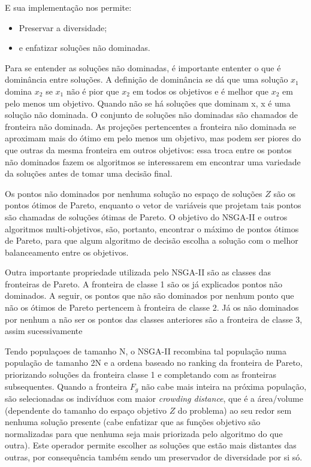 E sua implementação nos permite:

\begin{itemize}
    \item Preservar a diversidade;
    \item e enfatizar soluções não dominadas.
\end{itemize}

Para se entender as soluções não dominadas, é importante ententer o que é dominância entre soluções. A definição de dominância se dá que uma solução $x_{1}$ domina $x_{2}$ se $x_{1}$ não é pior que $x_{2}$ em todos os objetivos e é melhor que $x_{2}$ em pelo menos um objetivo. Quando não se há soluções que dominam x, x é uma solução não dominada. O conjunto de soluções não dominadas são chamados de fronteira não dominada. As projeções pertencentes a fronteira não dominada se aproximam mais do ótimo em pelo menos um objetivo, mas podem ser piores do que outras da mesma fronteira em outros objetivos: essa troca entre os pontos não dominados fazem os algoritmos se interessarem em encontrar uma variedade da soluções antes de tomar uma decisão final.

Os pontos não dominados por nenhuma solução no espaço de soluções $Z$ são os pontos ótimos de Pareto, enquanto o vetor de variáveis que projetam tais pontos são chamadas de soluções ótimas de Pareto. O objetivo do NSGA-II e outros algoritmos multi-objetivos, são, portanto, encontrar o máximo de pontos ótimos de Pareto, para que algum algoritmo de decisão escolha a solução com o melhor balanceamento entre os objetivos.

Outra importante propriedade utilizada pelo NSGA-II são as classes das fronteiras de Pareto. A fronteira de classe 1 são os já explicados pontos não dominados. A seguir, os pontos que não são dominados por nenhum ponto que não os ótimos de Pareto pertencem à fronteira de classe 2. Já os não dominados por nenhum a não ser os pontos das classes anteriores são a fronteira de classe 3, assim sucessivamente

Tendo populaçoes de tamanho N, o NSGA-II recombina tal população numa população de tamanho 2N e a ordena baseado no ranking da fronteira de Pareto, priorizando soluções da fronteira classe 1 e completando com as fronteiras subsequentes. Quando a fronteira $F_{g}$ não cabe mais inteira na próxima população, são selecionadas os indivíduos com maior \textit{crowding distance}, que é a área/volume (dependente do tamanho do espaço objetivo $Z$ do problema) ao seu redor sem nenhuma solução presente (cabe enfatizar que as funções objetivo são normalizadas para que nenhuma seja mais priorizada pelo algoritmo do que outra). Este operador permite escolher as soluções que estão mais distantes das outras, por consequência também sendo um preservador de diversidade por si só.

